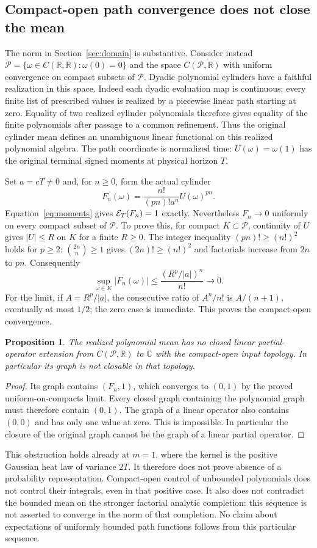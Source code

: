 \documentclass[11pt]{article}
\newtheorem{proposition}[theorem]{Proposition}
\theoremstyle{remark}\newtheorem{remark}[theorem]{Remark}
\newcommand{\R}{\mathbb R}\newcommand{\N}{\mathbb N}
\begin{document}
\subsection{Compact-open path convergence does not close the mean}
The norm in Section~\ref{sec:domain} is substantive. Consider instead
$\mathcal P=\{\omega\in C(\R,\R):\omega(0)=0\}$ and the space
$C(\mathcal P,\R)$ with uniform convergence on compact subsets of
$\mathcal P$. Dyadic polynomial cylinders have a faithful realization
in this space. Indeed each dyadic evaluation map is continuous; every
finite list of prescribed values is realized by a piecewise linear
path starting at zero. Equality of two realized cylinder polynomials
therefore gives equality of the finite polynomials after passage to
a common refinement. Thus the original cylinder mean defines an
unambiguous linear functional on this realized polynomial algebra.
The path coordinate is normalized time: $U(\omega)=\omega(1)$
has the original terminal signed moments at physical horizon $T$.

Set $a=cT\ne0$ and, for $n\geq0$, form the actual cylinder
\[
 F_n(\omega)=\frac{n!}{(pn)!a^n}U(\omega)^{pn}.
\]
Equation~\eqref{eq:moments} gives $\mathcal E_T(F_n)=1$ exactly.
Nevertheless $F_n\to0$ uniformly on every compact subset of
$\mathcal P$. To prove this, for compact $K\subset\mathcal P$,
continuity of $U$ gives $|U|\leq R$ on $K$ for a finite $R\geq0$.
The integer inequality $(pn)!\geq(n!)^2$ holds for $p\geq2$:
$\binom{2n}{n}\geq1$ gives $(2n)!\geq(n!)^2$ and factorials
increase from $2n$ to $pn$. Consequently
\[
 \sup_{\omega\in K}|F_n(\omega)|
 \leq\frac{(R^p/|a|)^n}{n!}\longrightarrow0.
\]
For the limit, if $A=R^p/|a|$, the consecutive ratio of
$A^n/n!$ is $A/(n+1)$, eventually at most $1/2$; the zero case
is immediate. This proves the compact-open convergence.

\begin{proposition}\label{prop:compactopenmean}
The realized polynomial mean has no closed linear partial-operator
extension from $C(\mathcal P,\R)$ to $\mathbb C$ with the
compact-open input topology. In particular its graph is not closable
in that topology.
\end{proposition}
\begin{proof}
Its graph contains $(F_n,1)$, which converges to $(0,1)$ by the
proved uniform-on-compacts limit. Every closed graph containing the
polynomial graph must therefore contain $(0,1)$. The graph of a
linear operator also contains $(0,0)$ and has only one value at
zero. This is impossible. In particular the closure of the original
graph cannot be the graph of a linear partial operator.
\end{proof}
This obstruction holds already at $m=1$, where the kernel is the
positive Gaussian heat law of variance $2T$. It therefore does not
prove absence of a probability representation. Compact-open control
of unbounded polynomials does not control their integrals, even in
that positive case. It also does not contradict the bounded mean on
the stronger factorial analytic completion: this sequence is not
asserted to converge in the norm of that completion. No claim about
expectations of uniformly bounded path functions follows from this
particular sequence.
\end{document}
